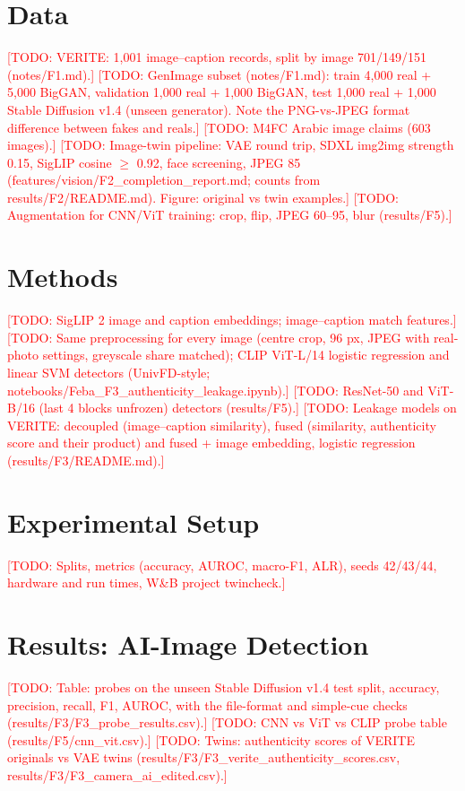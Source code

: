 \documentclass[11pt,a4paper]{article}
\newcommand{\todo}[1]{\textcolor{red}{[TODO: #1]}}
\begin{document}
\section{Data}
\label{sec:data}
\todo{VERITE: 1,001 image--caption records, split by image 701/149/151 (notes/F1.md).}
\todo{GenImage subset (notes/F1.md): train 4,000 real + 5,000 BigGAN, validation 1,000 real +
1,000 BigGAN, test 1,000 real + 1,000 Stable Diffusion v1.4 (unseen generator).
Note the PNG-vs-JPEG format difference between fakes and reals.}
\todo{M4FC Arabic image claims (603 images).}
\todo{Image-twin pipeline: VAE round trip, SDXL img2img strength 0.15, SigLIP cosine
$\ge$ 0.92, face screening, JPEG 85 (features/vision/F2_completion_report.md; counts from
results/F2/README.md). Figure: original vs twin examples.}
\todo{Augmentation for CNN/ViT training: crop, flip, JPEG 60--95, blur (results/F5).}

\section{Methods}
\label{sec:methods}
\todo{SigLIP 2 image and caption embeddings; image--caption match features.}
\todo{Same preprocessing for every image (centre crop, 96 px, JPEG with real-photo settings,
greyscale share matched); CLIP ViT-L/14 logistic regression and linear SVM detectors (UnivFD-style;
notebooks/Feba\_F3\_authenticity\_leakage.ipynb).}
\todo{ResNet-50 and ViT-B/16 (last 4 blocks unfrozen) detectors (results/F5).}
\todo{Leakage models on VERITE: decoupled (image--caption similarity), fused (similarity,
authenticity score and their product) and fused + image embedding, logistic regression (results/F3/README.md).}

\section{Experimental Setup}
\label{sec:setup}
\todo{Splits, metrics (accuracy, AUROC, macro-F1, ALR), seeds
42/43/44, hardware and run times, W\&B project twincheck.}

\section{Results: AI-Image Detection}
\label{sec:detection}
\todo{Table: probes on the unseen Stable Diffusion v1.4 test split, accuracy, precision, recall,
F1, AUROC, with the file-format and simple-cue checks (results/F3/F3\_probe\_results.csv).}
\todo{CNN vs ViT vs CLIP probe table (results/F5/cnn\_vit.csv).}
\todo{Twins: authenticity scores of VERITE originals vs VAE twins
(results/F3/F3\_verite\_authenticity\_scores.csv, results/F3/F3\_camera\_ai\_edited.csv).}
\end{document}
